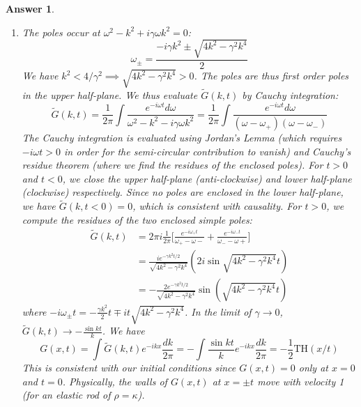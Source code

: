 \documentclass[a4paper]{article}
\newtheorem{ans}{Answer}[section]
\theoremstyle{new}
\begin{document}
\begin{ans}
\begin{enumerate}[label=(\alph*)]
\begin{eqnarray}
\end{eqnarray}
The result is $\hat{G}(k,\omega)=\frac{1}{\omega^2-k^2+i\gamma\omega k^2}$. 
\item The poles occur at $\omega^2-k^2+i\gamma\omega k^2=0$:
$$\omega_\pm=\frac{-i\gamma k^2\pm\sqrt{4k^2-\gamma^2k^4}}{2}$$
We have $k^2<4/\gamma^2\implies\sqrt{4k^2-\gamma^2k^4}>0$. The poles are thus first order poles in the upper half-plane. We thus evaluate $\tilde{G}(k,t)$ by Cauchy integration:
$$\tilde{G}(k,t)=\frac{1}{2\pi}\int\frac{e^{-i\omega t}d\omega}{\omega^2-k^2-i\gamma\omega k^2}=\frac{1}{2\pi}\int\frac{e^{-i\omega t}d\omega}{(\omega-\omega_+)(\omega-\omega_-)}$$
The Cauchy integration is evaluated using Jordan's Lemma (which requires $-i\omega t>0$ in order for the semi-circular contribution to vanish) and Cauchy's residue theorem (where we find the residues of the enclosed poles). For $t>0$ and $t<0$, we close the upper half-plane (anti-clockwise) and lower half-plane (clockwise) respectively. Since no poles are enclosed in the lower half-plane, we have $\tilde{G}(k,t<0)=0$, which is consistent with causality. For $t>0$, we compute the residues of the two enclosed simple poles:
\begin{align}
\tilde{G}(k,t)&=2\pi i\frac{1}{2\pi}\bigg[\frac{e^{-i\omega_+t}}{\omega_+-\omega-}+\frac{e^{-i\omega_-t}}{\omega_--\omega+}\bigg]\nonumber\\&=\frac{ie^{-\gamma k^2t/2}}{\sqrt{4k^2-\gamma^2k^4}}(2i\sin\sqrt{4k^2-\gamma^2k^4}t)\nonumber\\&=-\frac{2e^{-\gamma k^2t/2}}{\sqrt{4k^2-\gamma^2k^4}}\sin(\sqrt{4k^2-\gamma^2k^4}t)\nonumber
\end{align}
where $-i\omega_\pm t=-\frac{\gamma k^2}{2}t\mp it\sqrt{4k^2-\gamma^2k^4}$. In the limit of $\gamma\rightarrow 0$, $\tilde{G}(k,t)\rightarrow-\frac{\sin kt}{k}$. We have
$$G(x,t)=\int\tilde{G}(k,t)e^{-ikx}\frac{dk}{2\pi}=-\int\frac{\sin kt}{k}e^{-ikx}\frac{dk}{2\pi}=-\frac{1}{2}\text{TH}(x/t)$$
This is consistent with our initial conditions since $G(x,t)=0$ only at $x=0$ and $t=0$. Physically, the walls of $G(x,t)$ at $x=\pm t$ move with velocity 1 (for an elastic rod of $\rho=\kappa$).

\end{enumerate}
\end{ans}
\newpage
\end{document}
